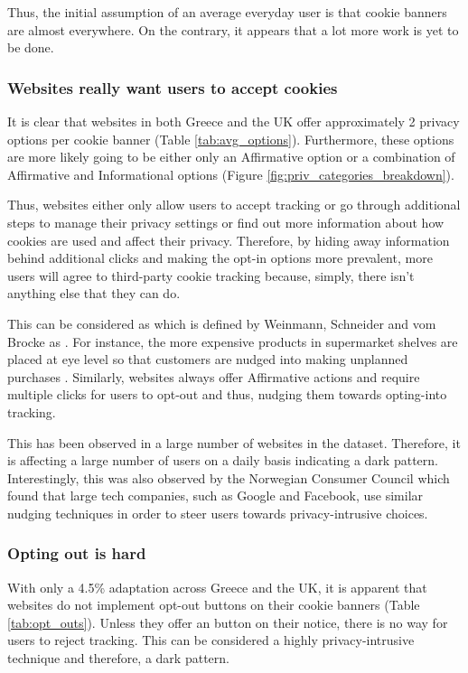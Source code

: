 \documentclass[../main.tex]{subfiles}
\begin{document}
Thus, the initial assumption of an average everyday user is that cookie banners are almost everywhere. On the contrary, it appears that a lot more work is yet to be done. 

\subsubsection{Websites really want users to accept cookies}
It is clear that websites in both Greece and the UK offer approximately 2 privacy options per cookie banner (Table \ref{tab:avg_options}). Furthermore, these options are more likely going to be either only an Affirmative option or a combination of Affirmative and Informational options (Figure \ref{fig:priv_categories_breakdown}). 

Thus, websites either only allow users to accept tracking or go through additional steps to manage their privacy settings or find out more information about how cookies are used and affect their privacy. Therefore, by hiding away information behind additional clicks and making the opt-in options more prevalent, more users will agree to third-party cookie tracking because, simply, there isn’t anything else that they can do. 

This can be considered as  which is defined by Weinmann, Schneider and vom Brocke as  \cite{weinmann2016digital}. For instance, the more expensive products in supermarket shelves are placed at eye level so that customers are nudged into making unplanned purchases \cite{schneider2018digital}. Similarly, websites always offer Affirmative actions and require multiple clicks for users to opt-out and thus, nudging them towards opting-into tracking.

This has been observed in a large number of websites in the dataset. Therefore, it is affecting a large number of users on a daily basis indicating a dark pattern. Interestingly, this was also observed by the Norwegian Consumer Council which found that large tech companies, such as Google and Facebook, use similar nudging techniques in order to steer users towards privacy-intrusive choices.

\subsubsection{Opting out is hard}
With only a 4.5\% adaptation across Greece and the UK, it is apparent that websites do not implement opt-out buttons on their cookie banners (Table \ref{tab:opt_outs}). Unless they offer an  button on their notice, there is no way for users to reject tracking. This can be considered a highly privacy-intrusive technique and therefore, a dark pattern. 
\end{document}
